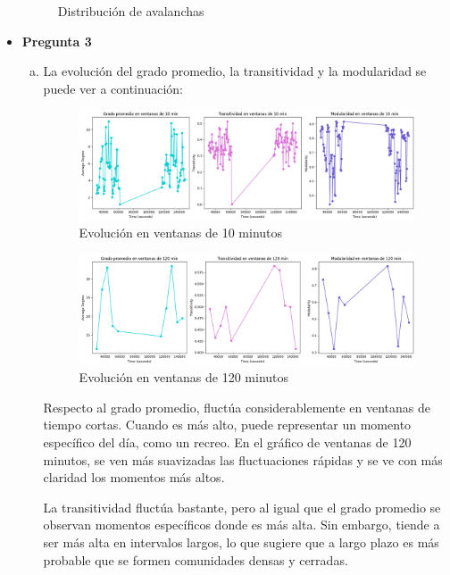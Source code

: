 \documentclass[10pt]{article}
\begin{document}
\begin{itemize}
\begin{figure}[H]
            \caption{Distribución de avalanchas}
            \label{fig:grafico_distribucion}
        \end{figure}
        \newpage
    \item \textbf{Pregunta 3}
        \begin{enumerate}[(a)]
            \item La evolución del grado promedio, la transitividad y la modularidad se puede ver a continuación:
            \begin{figure}[H]
                \centering
                \includegraphics[scale=0.4]{images/10min.png}
                \caption{Evolución en ventanas de 10 minutos}
                \label{fig:grafico_10min}
            \end{figure}

            \begin{figure}[H]
                \centering
                \includegraphics[scale=0.4]{images/120min.png}
                \caption{Evolución en ventanas de 120 minutos}
                \label{fig:grafico_120min}
            \end{figure}

            Respecto al grado promedio, fluctúa considerablemente en ventanas de tiempo cortas. Cuando es más alto, puede representar un momento específico del día, como un recreo. En el gráfico de ventanas de 120 minutos, se ven más suavizadas las fluctuaciones rápidas y se ve con más claridad los momentos más altos. 

            La transitividad fluctúa bastante, pero al igual que el grado promedio se observan momentos específicos donde es más alta. Sin embargo, tiende a ser más alta en intervalos largos, lo que sugiere que a largo plazo es más probable que se formen comunidades densas y cerradas.


\end{enumerate}
\end{itemize}
\end{document}
